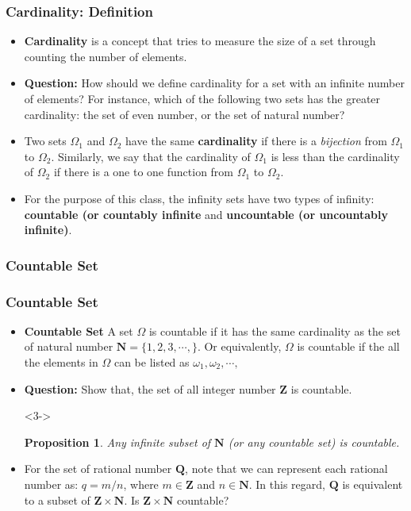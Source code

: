 \documentclass[handout]{beamer}
\newtheorem{Proposition}[theorem]{Proposition}
\begin{document}
\frame
{
  \frametitle{Cardinality: Definition}

  \begin{itemize}
  \item<1-> \textbf{Cardinality} is a concept that tries to measure the size of a set through counting the number of elements. 
  \item<2-> \textbf{Question:} How should we define cardinality for a set with an infinite number of elements? For instance, which of the following two sets has the greater cardinality: the set of even number, or the set of natural number? 
  \item<3-> Two sets $\Omega_1$ and $\Omega_2$ have the same \textbf{cardinality} if there is a \textit{bijection} from $\Omega_1$ to $\Omega_2$.  Similarly, we say that the cardinality of $\Omega_1$ is less than the cardinality of $\Omega_2$ if there is a one to one function from $\Omega_1$ to $\Omega_2$.
  \item<4-> For the purpose of this class, the infinity sets have two types of infinity: \textbf{countable (or countably infinite} and \textbf{uncountable (or uncountably infinite)}. 
  
  \end{itemize}
}



\subsubsection{Countable Set}

\frame
{
  \frametitle{Countable Set}

  \begin{itemize}
  \item<1-> \textbf{Countable Set} A set $\Omega$ is countable if it has the same cardinality as the set of natural number $\mathbf{N}=\{1,2,3,\cdots,\}$. Or equivalently, $\Omega$ is countable if the all the elements in $\Omega$ can be listed as $\omega_1,\omega_2,\cdots,$
  \item<2-> \textbf{Question:} Show that, the set of all integer number $\mathbf{Z}$ is countable.  
 \item [] <3-> \begin{Proposition} 
 Any infinite subset of $\mathbf{N}$ (or any countable set) is countable. 
 \end{Proposition} 

  \item<3-> For the set of rational number $\mathbf{Q}$, note that we can represent each rational number as: $q=m/n$, where $m\in \mathbf{Z}$ and $n \in \mathbf{N}$. In this regard, $\mathbf{Q}$ is equivalent to a subset of $\mathbf{Z}\times \mathbf{N}$. Is $\mathbf{Z}\times \mathbf{N}$ countable? 
  
  \end{itemize}
}
\end{document}
